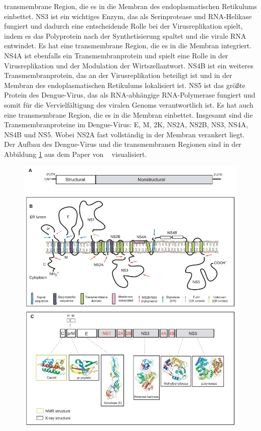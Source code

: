 \documentclass[german,version-2022-01]{uzl-thesis}
\begin{document}
transmembrane Region, die es in die Membran des endoplasmatischen Retikulums einbettet. NS3 ist ein wichtiges Enzym, das als Serinprotease und RNA-Helikase fungiert und dadurch eine entscheidende Rolle bei der Virusreplikation spielt, indem es das Polyprotein nach der Synthetisierung spaltet und die virale RNA entwindet. Es hat eine transmembrane Region, die es in die Membran integriert. NS4A ist ebenfalls ein Transmembranprotein und spielt eine Rolle in der Virusreplikation und der Modulation der Wirtszellantwort. NS4B ist ein weiteres Transmembranprotein, das an der Virusreplikation beteiligt ist und in der Membran des endoplasmatischen Retikulums lokalisiert ist. NS5 ist das gr\"o\ss{}te Protein des Dengue-Virus, das als RNA-abh\"angige RNA-Polymerase fungiert und somit f\"ur die Vervielf\"altigung des viralen Genoms verantwortlich ist. Es hat auch eine transmembrane Region, die es in die Membran einbettet.
Insgesamt sind die Transmembranproteine im Dengue-Virus: E, M, 2K, NS2A, NS2B, NS3, NS4A, NS4B und NS5. Wobei NS2A fast vollst\"andig in der Membran verankert liegt. Der Aufbau des Dengue-Virus und die transmembranen Regionen sind in der Abbildung \ref{fig:Dengue_virus_overview} aus dem Paper  von \citeauthor{perera_structural_2008}~\cite{perera_structural_2008} visualisiert. 
\begin{figure}[tbp]
  \centering
  \includegraphics[scale=1]{Images/Dengue_virus_overview.jpg}
  \caption{ \cite{perera_structural_2008}}
  \label{fig:Dengue_virus_overview}
\end{figure} 
\end{document}
